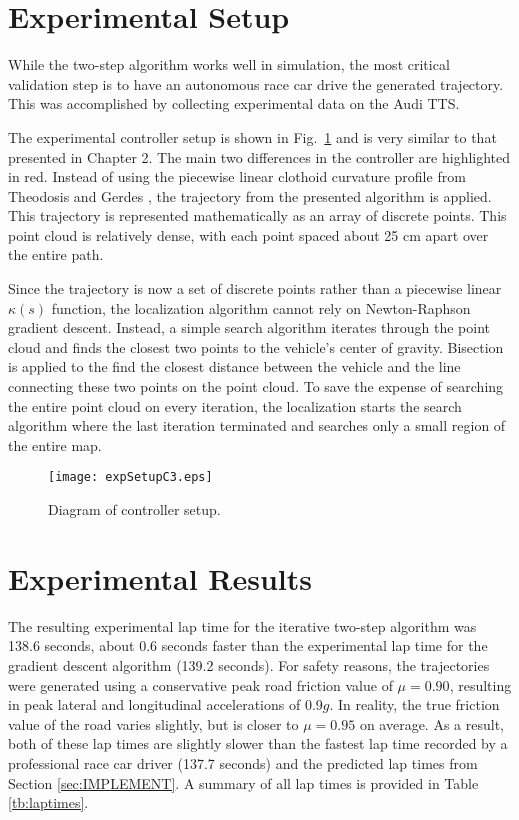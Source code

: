 \section{Experimental Setup} 
\label{sec:EXP}
While the two-step algorithm works well in simulation, the most critical validation step is to have an
autonomous race car drive the generated trajectory. This was accomplished by 
collecting experimental data on the Audi TTS.  

The experimental controller setup is shown in Fig.~\ref{fig:expSetupC3} 
and is very similar to that presented in Chapter 2. The main two differences in the controller are highlighted
in red. Instead of using the piecewise linear clothoid  curvature profile from Theodosis and Gerdes \cite{theodosis}, the trajectory
from the presented algorithm is applied. This trajectory is 
represented mathematically as an array of discrete points. This point cloud is relatively
dense, with each point spaced about 25 cm apart over the entire path.

Since the trajectory is now a set of discrete points rather than a piecewise linear $\kappa(s)$ function, the localization algorithm cannot rely on Newton-Raphson gradient descent. Instead, a
simple search algorithm iterates through the point cloud and finds the closest two points to the vehicle's center of
gravity. Bisection is applied to the find the closest distance between the vehicle and the line connecting these
two points on the point cloud. To save the expense of searching the entire point cloud on every iteration, 
the localization starts the search algorithm where the last iteration terminated and searches only a small region
of the entire map. 

\begin{figure}[tb]
\centering
\texttt{[image: expSetupC3.eps]}
\caption{Diagram of controller setup.}
\label{fig:expSetupC3}
\end{figure}

\section{Experimental Results}
\label{sec:ch3ExpRes}

The resulting experimental lap time for the iterative two-step algorithm was 138.6 seconds, about 0.6 seconds faster
than the experimental lap time for the gradient descent algorithm (139.2 seconds). For safety reasons, the trajectories were generated using a conservative peak road friction value of $\mu = 0.90$,
 resulting in peak lateral and longitudinal accelerations of 0.9$g$. In reality, the true friction value of the road varies slightly, but is closer to $\mu = 0.95$ on average. As a
result, both of these lap times are slightly slower than the fastest lap time recorded by a professional race car driver (137.7 seconds) and
 the predicted lap times from Section \ref{sec:IMPLEMENT}. A summary of all lap times is provided in Table \ref{tb:laptimes}.

